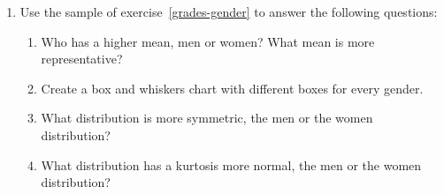 \begin{enumerate}[leftmargin=*,resume]
\item Use the sample of exercise~\ref{grades-gender} to answer the following questions:
\begin{enumerate}
\item Who has a higher mean, men or women?
What mean is more representative?
\item Create a box and whiskers chart with different boxes for every gender. 
\item What distribution is more symmetric, the men or the women distribution?
\item What distribution has a kurtosis more normal, the men or the women distribution?
\end{enumerate}

\end{enumerate}